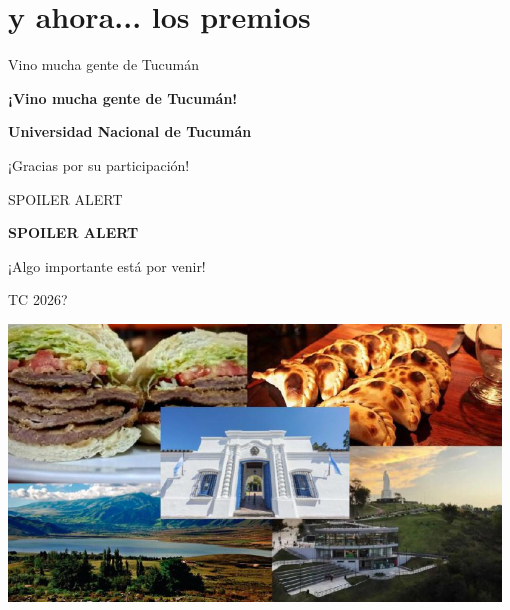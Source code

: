 \documentclass{beamer}
\begin{document}
\section{y ahora... los premios}

\begin{frame}{Vino mucha gente de Tucumán}
\begin{center}
\Large
\textbf{¡Vino mucha gente de Tucumán!}

\vspace{1cm}


\vspace{1cm}

\normalsize
\textbf{Universidad Nacional de Tucumán}

\vspace{0.5cm}

¡Gracias por su participación!
\end{center}
\end{frame}

\begin{frame}{SPOILER ALERT}
\begin{center}
\Huge
\textbf{SPOILER ALERT}

\vspace{2cm}

\Large
¡Algo importante está por venir!
\end{center}
\end{frame}

\begin{frame}{TC 2026?}
\begin{center}
\includegraphics[width=0.98\textwidth,height=0.9\textheight,keepaspectratio]{img/tucu.jpeg}
\end{center}
\end{frame}
\end{document}

